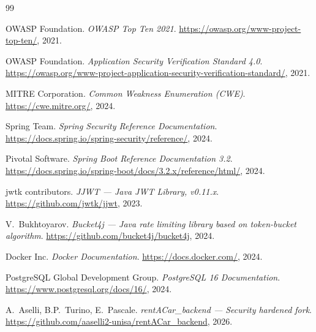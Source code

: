 \documentclass[12pt, a4paper]{article}
\begin{document}
    \newpage
    \begin{thebibliography}{99}

        OWASP Foundation.
        \textit{OWASP Top Ten 2021}.
        \url{https://owasp.org/www-project-top-ten/}, 2021.

        OWASP Foundation.
        \textit{Application Security Verification Standard 4.0}.
        \url{https://owasp.org/www-project-application-security-verification-standard/}, 2021.

        MITRE Corporation.
        \textit{Common Weakness Enumeration (CWE)}.
        \url{https://cwe.mitre.org/}, 2024.

        Spring Team.
        \textit{Spring Security Reference Documentation}.
        \url{https://docs.spring.io/spring-security/reference/}, 2024.

        Pivotal Software.
        \textit{Spring Boot Reference Documentation 3.2}.
        \url{https://docs.spring.io/spring-boot/docs/3.2.x/reference/html/}, 2024.

        jwtk contributors.
        \textit{JJWT --- Java JWT Library, v0.11.x}.
        \url{https://github.com/jwtk/jjwt}, 2023.

        V.~Bukhtoyarov.
        \textit{Bucket4j --- Java rate limiting library based on token-bucket algorithm}.
        \url{https://github.com/bucket4j/bucket4j}, 2024.

        Docker Inc.
        \textit{Docker Documentation}.
        \url{https://docs.docker.com/}, 2024.

        PostgreSQL Global Development Group.
        \textit{PostgreSQL 16 Documentation}.
        \url{https://www.postgresql.org/docs/16/}, 2024.

        A.~Aselli, B.P.~Turino, E.~Pascale.
        \textit{rentACar\_backend --- Security hardened fork}.
        \url{https://github.com/aaselli2-unisa/rentACar_backend}, 2026.

    \end{thebibliography}
\end{document}
